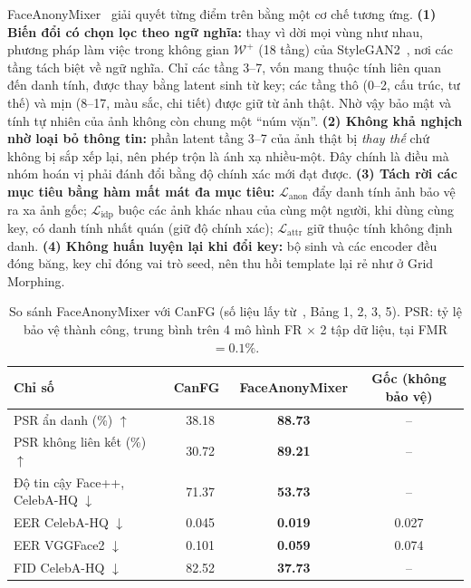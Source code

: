 \documentclass[12pt,a4paper]{article}
\begin{document}
FaceAnonyMixer~\cite{alam2025} giải quyết từng điểm trên bằng một cơ chế tương ứng. \textbf{(1) Biến đổi có chọn lọc theo ngữ nghĩa:} thay vì dời mọi vùng như nhau, phương pháp làm việc trong không gian $\mathcal{W}^{+}$ (18 tầng) của StyleGAN2~\cite{karras2020}, nơi các tầng tách biệt về ngữ nghĩa. Chỉ các tầng 3–7, vốn mang thuộc tính liên quan đến danh tính, được thay bằng latent sinh từ key; các tầng thô (0–2, cấu trúc, tư thế) và mịn (8–17, màu sắc, chi tiết) được giữ từ ảnh thật. Nhờ vậy bảo mật và tính tự nhiên của ảnh không còn chung một ``núm vặn''. \textbf{(2) Không khả nghịch nhờ loại bỏ thông tin:} phần latent tầng 3–7 của ảnh thật bị \emph{thay thế} chứ không bị sắp xếp lại, nên phép trộn là ánh xạ nhiều-một. Đây chính là điều mà nhóm hoán vị phải đánh đổi bằng độ chính xác mới đạt được. \textbf{(3) Tách rời các mục tiêu bằng hàm mất mát đa mục tiêu:} $\mathcal{L}_{\text{anon}}$ đẩy danh tính ảnh bảo vệ ra xa ảnh gốc; $\mathcal{L}_{\text{idp}}$ buộc các ảnh khác nhau của cùng một người, khi dùng cùng key, có danh tính nhất quán (giữ độ chính xác); $\mathcal{L}_{\text{attr}}$ giữ thuộc tính không định danh. \textbf{(4) Không huấn luyện lại khi đổi key:} bộ sinh và các encoder đều đóng băng, key chỉ đóng vai trò seed, nên thu hồi template lại rẻ như ở Grid Morphing.

\begin{table}[h]
\centering\small
\caption{So sánh FaceAnonyMixer với CanFG (số liệu lấy từ~\cite{alam2025}, Bảng 1, 2, 3, 5). PSR: tỷ lệ bảo vệ thành công, trung bình trên 4 mô hình FR $\times$ 2 tập dữ liệu, tại FMR $=0.1\%$.}
\label{tab:sota}
\begin{tabular}{@{}lccc@{}}
\toprule
Chỉ số & CanFG~\cite{wang2024canfg} & FaceAnonyMixer & Gốc (không bảo vệ) \\
\midrule
PSR ẩn danh (\%) $\uparrow$ & 38.18 & \textbf{88.73} & -- \\
PSR không liên kết (\%) $\uparrow$ & 30.72 & \textbf{89.21} & -- \\
Độ tin cậy Face++, CelebA-HQ $\downarrow$ & 71.37 & \textbf{53.73} & -- \\
EER CelebA-HQ $\downarrow$ & 0.045 & \textbf{0.019} & 0.027 \\
EER VGGFace2 $\downarrow$ & 0.101 & \textbf{0.059} & 0.074 \\
FID CelebA-HQ $\downarrow$ & 82.52 & \textbf{37.73} & -- \\
\bottomrule
\end{tabular}
\end{table}
\end{document}
